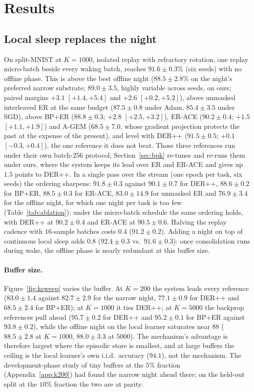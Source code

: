 \documentclass{article}
\begin{document}
\section{Results}
\label{sec:results}

\subsection{Local sleep replaces the night}
\label{sec:r1}

On split-MNIST at $K{=}1000$, isolated replay with refractory rotation, one replay
micro-batch beside every waking batch, reaches $\mathbf{91.6\pm0.3\%}$ (six seeds) with no
offline phase. This is above the best offline night ($88.5\pm2.8\%$ on the night's preferred
narrow substrate; $89.0\pm3.5$, highly variable across seeds, on ours; paired margins $+3.1$
$[+1.4,+5.4]$ and $+2.6$ $[+0.2,+5.2]$), above unmasked interleaved ER at the same budget
($87.5\pm0.8$ under Adam, $85.4\pm3.5$ under SGD), above BP+ER ($88.8\pm0.3$; $+2.8$
$[+2.5,+3.2]$), ER-ACE ($90.2\pm0.4$; $+1.5$ $[+1.1,+1.9]$) and A-GEM ($68.5\pm7.0$, whose
gradient projection protects the past at the expense of the present), and level with DER++
($91.5\pm0.5$; $+0.1$ $[-0.3,+0.4]$), the one reference it does not beat. Those three
references run under their own batch-$256$ protocol; Section~\ref{sec:bpk} re-tunes and
re-runs them under ours, where the system keeps its lead over ER and ER-ACE and gives up
$1.5$ points to DER++. In a single pass
over the stream (one epoch per task, six seeds) the ordering sharpens: $91.8\pm0.3$ against
$90.1\pm0.7$ for DER++, $88.6\pm0.2$ for BP+ER, $88.5\pm0.3$ for ER-ACE, $83.0\pm14.9$ for
unmasked ER and $76.9\pm3.4$ for the offline night, for which one night per task is too few
(Table~\ref{tab:ablation}); under the micro-batch schedule the same ordering holds, with
DER++ at $90.2\pm0.4$ and ER-ACE at $90.5\pm0.6$. Halving the replay cadence with $16$-sample batches costs $0.4$
($91.2\pm0.2$). Adding a night on top of continuous local sleep adds $0.8$ ($92.4\pm0.3$ vs.\
$91.6\pm0.3$): once consolidation runs during wake, the offline phase is nearly redundant at
this buffer size.

\paragraph{Buffer size.} Figure~\ref{fig:ksweep} varies the buffer. At $K{=}200$ the system
leads every reference ($83.0\pm1.4$ against $82.7\pm2.9$ for the narrow night,
$77.1\pm0.9$ for DER++ and $68.5\pm2.4$ for BP+ER); at $K{=}1000$ it ties DER++; at
$K{=}5000$ the backprop references pull ahead ($95.7\pm0.2$ for DER++ and $95.2\pm0.1$ for
BP+ER against $93.8\pm0.2$), while the offline night on the local learner saturates near
$88$ ($88.5\pm2.8$ at $K{=}1000$, $88.0\pm3.3$ at $5000$). The mechanism's advantage is
therefore largest where the episodic store is smallest, and at large buffers the ceiling is
the local learner's own i.i.d.\ accuracy ($94.1$), not the mechanism. The development-phase
study of tiny buffers at the $5\%$ fraction (Appendix~\ref{app:k200}) had found the narrow
night ahead there; on the held-out split at the $10\%$ fraction the two are at parity.
\end{document}
